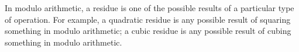 In modulo arithmetic, a residue is one of the possible
results of a particular type of operation. For example,
a quadratic residue is any possible result of squaring
something in modulo arithmetic; a cubic residue is
any possible result of cubing something in modulo
arithmetic.